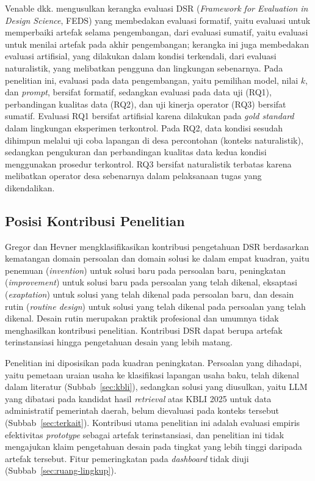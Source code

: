 Venable dkk. \cite{venable2016feds} mengusulkan kerangka evaluasi DSR (\textit{Framework for Evaluation in Design Science}, FEDS) yang membedakan evaluasi formatif, yaitu evaluasi untuk memperbaiki artefak selama pengembangan, dari evaluasi sumatif, yaitu evaluasi untuk menilai artefak pada akhir pengembangan; kerangka ini juga membedakan evaluasi artifisial, yang dilakukan dalam kondisi terkendali, dari evaluasi naturalistik, yang melibatkan pengguna dan lingkungan sebenarnya. Pada penelitian ini, evaluasi pada data pengembangan, yaitu pemilihan model, nilai $k$, dan \textit{prompt}, bersifat formatif, sedangkan evaluasi pada data uji (RQ1), perbandingan kualitas data (RQ2), dan uji kinerja operator (RQ3) bersifat sumatif. Evaluasi RQ1 bersifat artifisial karena dilakukan pada \textit{gold standard} dalam lingkungan eksperimen terkontrol. Pada RQ2, data kondisi sesudah dihimpun melalui uji coba lapangan di desa percontohan (konteks naturalistik), sedangkan pengukuran dan perbandingan kualitas data kedua kondisi menggunakan prosedur terkontrol. RQ3 bersifat naturalistik terbatas karena melibatkan operator desa sebenarnya dalam pelaksanaan tugas yang dikendalikan.

\subsection{Posisi Kontribusi Penelitian}

\begin{sloppypar}Gregor dan Hevner \cite{gregor2013positioning} mengklasifikasikan kontribusi pengetahuan DSR berdasarkan kematangan domain persoalan dan domain solusi ke dalam empat kuadran, yaitu penemuan (\textit{invention}) untuk solusi baru pada persoalan baru, peningkatan (\textit{improvement}) untuk solusi baru pada persoalan yang telah dikenal, eksaptasi (\textit{exaptation}) untuk solusi yang telah dikenal pada persoalan baru, dan desain rutin (\textit{routine design}) untuk solusi yang telah dikenal pada persoalan yang telah dikenal. Desain rutin merupakan praktik profesional dan umumnya tidak menghasilkan kontribusi penelitian. Kontribusi DSR dapat berupa artefak terinstansiasi hingga pengetahuan desain yang lebih matang.\end{sloppypar}

Penelitian ini diposisikan pada kuadran peningkatan. Persoalan yang dihadapi, yaitu pemetaan uraian usaha ke klasifikasi lapangan usaha baku, telah dikenal dalam literatur (Subbab~\ref{sec:kbli}), sedangkan solusi yang diusulkan, yaitu LLM yang dibatasi pada kandidat hasil \textit{retrieval} atas KBLI 2025 untuk data administratif pemerintah daerah, belum dievaluasi pada konteks tersebut (Subbab~\ref{sec:terkait}). Kontribusi utama penelitian ini adalah evaluasi empiris efektivitas \textit{prototype} sebagai artefak terinstansiasi, dan penelitian ini tidak mengajukan klaim pengetahuan desain pada tingkat yang lebih tinggi daripada artefak tersebut. Fitur pemeringkatan pada \textit{dashboard} tidak diuji (Subbab~\ref{sec:ruang-lingkup}).

